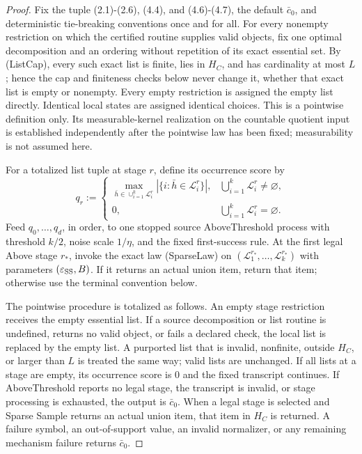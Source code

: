 \begin{proof}
Fix the tuple (2.1)-(2.6), (4.4), and (4.6)-(4.7), the default
\(\bar c_0\), and deterministic tie-breaking conventions once and for all.
For every nonempty restriction on which the certified routine supplies valid
objects, fix one optimal decomposition and an ordering without repetition of
its exact essential set. By (ListCap), every such exact list is finite, lies
in \(H_C\), and has cardinality at most \(L\); hence the cap and finiteness
checks below never change it, whether that exact list is empty or nonempty.
Every empty restriction is assigned the empty list directly. Identical local
states are assigned identical choices. This is a pointwise definition only.
Its measurable-kernel realization on the countable quotient input is
established independently after the pointwise law has been fixed;
measurability is not assumed here.

For a totalized list tuple at stage \(r\), define its occurrence score by
\[
q_r:=
\begin{cases}
\displaystyle\max_{\bar h\in\cup_{i=1}^k\mathcal L_i^r}
|\{i:\bar h\in\mathcal L_i^r\}|,
&\bigcup_{i=1}^k\mathcal L_i^r\ne\varnothing,\\[4pt]
0,&\bigcup_{i=1}^k\mathcal L_i^r=\varnothing.
\end{cases}
\tag{5.1}
\]
Feed \(q_0,\ldots,q_d\), in order, to one stopped source
AboveThreshold process with threshold \(k/2\), noise scale \(1/\eta\), and
the fixed first-success rule. At the first legal Above stage \(r_*\), invoke
the exact law (SparseLaw) on
\((\mathcal L_1^{r_*},\ldots,\mathcal L_k^{r_*})\) with parameters
\((\varepsilon_{\rm SS},B)\). If it returns an actual union item, return
that item; otherwise use the terminal convention below.

The pointwise procedure is totalized as follows. An empty stage restriction
receives the empty essential list. If a source decomposition or list routine
is undefined, returns no valid object, or fails a declared check, the local
list is replaced by the empty list. A purported list that is invalid,
nonfinite, outside \(H_C\), or larger than \(L\) is treated the same way;
valid lists are unchanged. If all lists at a stage are empty, its occurrence
score is \(0\) and the fixed transcript continues. If AboveThreshold reports
no legal stage, the transcript is invalid, or stage processing is exhausted,
the output is \(\bar c_0\). When a legal stage is selected and Sparse Sample
returns an actual union item, that item in \(H_C\) is returned. A failure
symbol, an out-of-support value, an invalid normalizer, or any remaining
mechanism failure returns \(\bar c_0\).


\end{proof}
